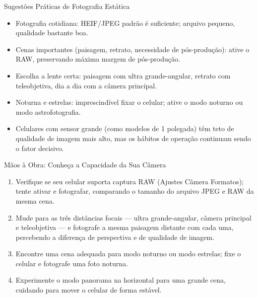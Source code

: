 \begin{tcbinfo}{Sugestões Práticas de Fotografia Estática}
\begin{itemize}
  \item Fotografia cotidiana: HEIF/JPEG padrão é suficiente; arquivo pequeno, qualidade bastante boa.
  \item Cenas importantes (paisagem, retrato, necessidade de pós-produção): ative o RAW, preservando máxima margem de pós-produção.
  \item Escolha a lente certa: paisagem com ultra grande-angular, retrato com teleobjetiva, dia a dia com a câmera principal.
  \item Noturna e estrelas: imprescindível fixar o celular; ative o modo noturno ou modo astrofotografia.
  \item Celulares com sensor grande (como modelos de 1 polegada) têm teto de qualidade de imagem mais alto, mas os hábitos de operação continuam sendo o fator decisivo.
\end{itemize}

\end{tcbinfo}

\begin{tcbpractice}{Mãos à Obra: Conheça a Capacidade da Sua Câmera}
\begin{enumerate}
  \item Verifique se seu celular suporta captura RAW (Ajustes Câmera Formatos); tente ativar e fotografar, comparando o tamanho do arquivo JPEG e RAW da mesma cena.
  \item Mude para as três distâncias focais — ultra grande-angular, câmera principal e teleobjetiva — e fotografe a mesma paisagem distante com cada uma, percebendo a diferença de perspectiva e de qualidade de imagem.
  \item Encontre uma cena adequada para modo noturno ou modo estrelas; fixe o celular e fotografe uma foto noturna.
  \item Experimente o modo panorama na horizontal para uma grande cena, cuidando para mover o celular de forma estável.
\end{enumerate}

\end{tcbpractice}
